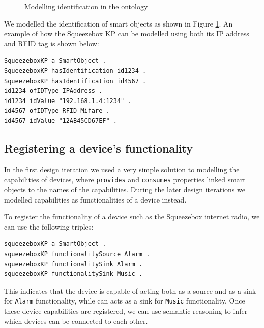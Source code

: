 \begin{figure}[bth]
	\begin{center}
	\end{center}
	\caption{Modelling identification in the ontology}
	\label{identification}
\end{figure}

We modelled the identification of smart objects as shown in Figure \ref{identification}. An example of how the Squeezebox \ac{KP} can be modelled using both its IP address and \ac{RFID} tag is shown below:

\begin{verbatim}
SqueezeboxKP a SmartObject .
SqueezeboxKP hasIdentification id1234 .
SqueezeboxKP hasIdentification id4567 .
id1234 ofIDType IPAddress .
id1234 idValue "192.168.1.4:1234" .
id4567 ofIDType RFID_Mifare .
id4567 idValue "12AB45CD67EF" .
\end{verbatim}

\subsection{Registering a device's functionality}

In the first design iteration we used a very simple solution to modelling the capabilities of devices, where \texttt{provides} and \texttt{consumes} properties linked smart objects to the names of the capabilities. During the later design iterations we modelled capabilities as functionalities of a device instead.

To register the functionality of a device such as the Squeezebox internet radio, we can use the following triples:

\begin{verbatim}
squeezeboxKP a SmartObject .
squeezeboxKP functionalitySource Alarm .
squeezeboxKP functionalitySink Alarm .
squeezeboxKP functionalitySink Music .	
\end{verbatim}

This indicates that the device is capable of acting both as a source and as a sink for \texttt{Alarm} functionality, while can acts as a sink for \texttt{Music} functionality. Once these device capabilities are registered, we can use semantic reasoning to infer which devices can be connected to each other.



